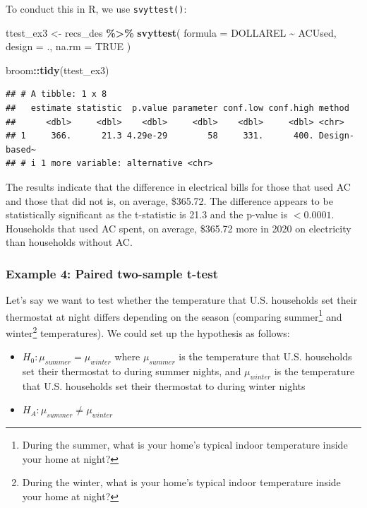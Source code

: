 \documentclass[
]{krantz}
\makeatletter
\newenvironment{Shaded}{\begin{snugshade}}{\end{snugshade}}
\newcommand{\AttributeTok}[1]{\textcolor[rgb]{0.27,0.27,0.27}{#1}}
\newcommand{\ConstantTok}[1]{\textcolor[rgb]{0.37,0.37,0.37}{#1}}
\newcommand{\FunctionTok}[1]{\textcolor[rgb]{0.27,0.27,0.27}{\textbf{#1}}}
\newcommand{\NormalTok}[1]{#1}
\newcommand{\OtherTok}[1]{\textcolor[rgb]{0.37,0.37,0.37}{#1}}
\newcommand{\SpecialCharTok}[1]{\textcolor[rgb]{0.43,0.43,0.43}{\textbf{#1}}}
\providecommand{\tightlist}{%
  \setlength{\itemsep}{0pt}\setlength{\parskip}{0pt}}
\newenvironment{kframe}{%
\medskip{}
\setlength{\fboxsep}{.8em}
 \def\at@end@of@kframe{}%
 \ifinner\ifhmode%
  \def\at@end@of@kframe{\end{minipage}}%
  \begin{minipage}{\columnwidth}%
 \fi\fi%
 \def\FrameCommand##1{\hskip\@totalleftmargin \hskip-\fboxsep
 \colorbox{shadecolor}{##1}\hskip-\fboxsep
     \hskip-\linewidth \hskip-\@totalleftmargin \hskip\columnwidth}%
 \MakeFramed {\advance\hsize-\width
   \@totalleftmargin\z@ \linewidth\hsize
   \@setminipage}}%
 {\par\unskip\endMakeFramed%
 \at@end@of@kframe}
\renewenvironment{Shaded}{\begin{kframe}}{\end{kframe}}
\makeatother
\begin{document}
To conduct this in R, we use \texttt{svyttest()}:

\begin{Shaded}
\begin{Highlighting}[]
\NormalTok{ttest\_ex3 }\OtherTok{\textless{}{-}}\NormalTok{ recs\_des }\SpecialCharTok{\%\textgreater{}\%}
  \FunctionTok{svyttest}\NormalTok{(}
    \AttributeTok{formula =}\NormalTok{ DOLLAREL }\SpecialCharTok{\textasciitilde{}}\NormalTok{ ACUsed,}
    \AttributeTok{design =}\NormalTok{ .,}
    \AttributeTok{na.rm =} \ConstantTok{TRUE}
\NormalTok{  )}

\NormalTok{broom}\SpecialCharTok{::}\FunctionTok{tidy}\NormalTok{(ttest\_ex3)}
\end{Highlighting}
\end{Shaded}

\begin{verbatim}
## # A tibble: 1 x 8
##   estimate statistic  p.value parameter conf.low conf.high method       
##      <dbl>     <dbl>    <dbl>     <dbl>    <dbl>     <dbl> <chr>        
## 1     366.      21.3 4.29e-29        58     331.      400. Design-based~
## # i 1 more variable: alternative <chr>
\end{verbatim}

The results indicate that the difference in electrical bills for those that used AC and those that did not is, on average, \$365.72. The difference appears to be statistically significant as the t-statistic is 21.3 and the p-value is \(<0.0001\). Households that used AC spent, on average, \$365.72 more in 2020 on electricity than households without AC.

\hypertarget{stattest-ttest-ex4}{%
\subsubsection*{Example 4: Paired two-sample t-test}\label{stattest-ttest-ex4}}


Let's say we want to test whether the temperature that U.S. households set their thermostat at night differs depending on the season (comparing summer\footnote{During the summer, what is your home's typical indoor temperature inside your home at night?} and winter\footnote{During the winter, what is your home's typical indoor temperature inside your home at night?} temperatures). We could set up the hypothesis as follows:

\begin{itemize}
\tightlist
\item
  \(H_0: \mu_{summer} = \mu_{winter}\) where \(\mu_{summer}\) is the temperature that U.S. households set their thermostat to during summer nights, and \(\mu_{winter}\) is the temperature that U.S. households set their thermostat to during winter nights
\item
  \(H_A: \mu_{summer} \neq \mu_{winter}\)
\end{itemize}
\end{document}
